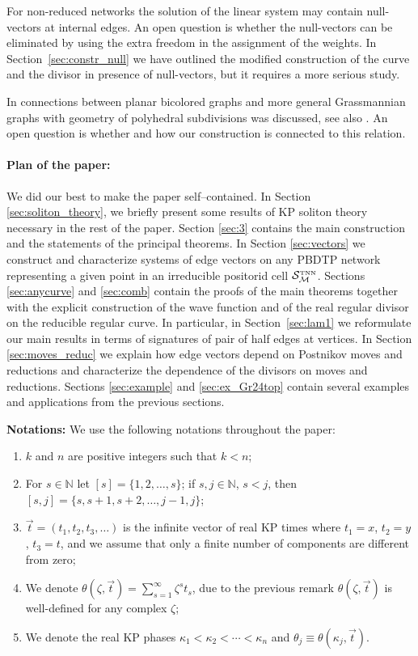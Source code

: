 \documentclass[11pt]{amsart}
\theoremstyle{plain}
\numberwithin{equation}{section}
\def \S {{\mathcal S}_{\mathcal M}^{\mbox{\tiny TNN}}}
\begin{document}
For non-reduced networks the solution of the linear system may contain null-vectors at internal edges. An open question is whether the null-vectors can be eliminated by using the extra freedom in the assignment of the weights. In Section~\ref{sec:constr_null} we have outlined the modified construction of the curve and the divisor in presence of null-vectors, but it requires a more serious study.

In \cite{Pos2} connections between planar bicolored graphs and more general Grassmannian graphs with geometry of polyhedral subdivisions was discussed, see also \cite{PSW}. An open question is whether and how our construction is connected to this relation.

\smallskip

\paragraph{\textbf{Plan of the paper}:} We did our best to make the paper self--contained. In Section \ref{sec:soliton_theory}, we briefly present some results of KP soliton theory necessary in the rest of the paper. Section \ref{sec:3} contains the main construction and the statements of the principal theorems.
In Section \ref{sec:vectors} we construct and characterize systems of edge vectors on any PBDTP network representing a given point in an irreducible positorid cell $\S$. Sections \ref{sec:anycurve} and \ref{sec:comb} contain the proofs of the main theorems together with the explicit construction of the wave function and of the real regular divisor on the reducible regular curve. In particular, in Section~\ref{sec:lam1} we reformulate our main results in terms of signatures of pair of half edges at vertices.
In Section \ref{sec:moves_reduc} we explain how edge vectors depend on Postnikov moves and reductions and characterize the dependence of the divisors on moves and reductions. Sections \ref{sec:example} and \ref{sec:ex_Gr24top} contain several examples and applications from the previous sections.

{\bf Notations:} We use the following notations throughout the paper:
\begin{enumerate}
\item $k$ and $n$ are positive integers such that $k<n$;
\item  For $s\in {\mathbb N}$ let $[s] =\{ 1,2,\dots, s\}$; if $s,j \in {\mathbb N}$, $s<j$, then
$[s,j] =\{ s, s+1, s+2,\dots, j-1,j\}$;
\item  ${\vec t} = (t_1,t_2,t_3,\dots)$ is the infinite vector of real KP times where $t_1=x$, $t_2=y$, $t_3=t$, and we assume that only a finite number of components are different from zero;
\item We denote $\theta(\zeta,\vec t)= \sum\limits_{s=1}^{\infty} \zeta^s t_s$, due to the previous remark  $\theta(\zeta,\vec t)$ is well-defined for any complex $\zeta$;
\item We denote the real KP phases 
$\kappa_1< \kappa_2 < \cdots < \kappa_n$ and
$\theta_j \equiv \theta (\kappa_j, \vec t)$.
\end{enumerate}
\end{document}
